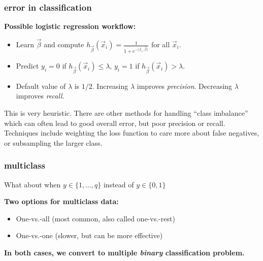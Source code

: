 \documentclass[handout,compress]{beamer}
\begin{document}
\begin{frame}
	\frametitle{error in classification}
	\textbf{Possible logistic regression workflow:}
	\begin{itemize}
		\item Learn $\vec{\beta}$ and compute $h_{\vec{\beta}}(\vec{x}_i) = \frac{1}{1 + e^{-\langle\vec{x}_i,\vec{\beta}\rangle}}$ for all $\vec{x}_i$.
		\item Predict $y_i = 0$ if  $h_{\vec{\beta}}(\vec{x}_i)  \leq \lambda$, $y_i = 1$ if  $h_{\vec{\beta}}(\vec{x}_i)  > \lambda$.
		\item Default value of $\lambda$ is $1/2$. Increasing $\lambda$ improves \emph{precision}. Decreasing $\lambda$ improves \emph{recall}.
	\end{itemize}

	This is very heuristic. There are other methods for handling ``class imbalance'' which can often lead to good overall error, but poor precision or recall. Techniques include weighting the loss function to care more about false negatives, or subsampling the larger class.
\end{frame}

\begin{frame}
	\frametitle{multiclass}
	\begin{center}
		What about when $y \in \{1,\ldots, q\}$ instead of $y\in \{0,1\}$
	\end{center}
	\textbf{Two options for multiclass data:}
	\begin{itemize}
		\item One-vs.-all (most common, also called one-vs.-rest)
		\item One-vs.-one (slower, but can be more effective)
	\end{itemize}
	\begin{center}
		\textbf{In both cases, we convert to multiple \emph{binary} classification problem.}
	\end{center}
\end{frame}
\end{document}
